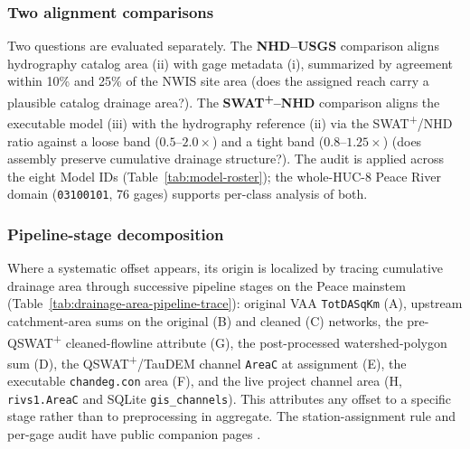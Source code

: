 \subsubsection*{Two alignment comparisons}
Two questions are evaluated separately. The \textbf{NHD--USGS} comparison aligns hydrography catalog area (ii) with gage metadata (i), summarized by agreement within 10\% and 25\% of the NWIS site area (does the assigned reach carry a plausible catalog drainage area?). The \textbf{SWAT\textsuperscript{+}--NHD} comparison aligns the executable model (iii) with the hydrography reference (ii) via the SWAT\textsuperscript{+}/NHD ratio against a loose band ($0.5$--$2.0\times$) and a tight band ($0.8$--$1.25\times$) (does assembly preserve cumulative drainage structure?). The audit is applied across the eight Model IDs (Table~\ref{tab:model-roster}); the whole-HUC-8 Peace River domain (\texttt{03100101}, 76 gages) supports per-class analysis of both.

\subsubsection*{Pipeline-stage decomposition}
Where a systematic offset appears, its origin is localized by tracing cumulative drainage area through successive pipeline stages on the Peace mainstem (Table~\ref{tab:drainage-area-pipeline-trace}): original VAA \texttt{TotDASqKm} (A), upstream catchment-area sums on the original (B) and cleaned (C) networks, the pre-QSWAT\textsuperscript{+} cleaned-flowline attribute (G), the post-processed watershed-polygon sum (D), the QSWAT\textsuperscript{+}/TauDEM channel \texttt{AreaC} at assignment (E), the executable \texttt{chandeg.con} area (F), and the live project channel area (H, \texttt{rivs1.AreaC} and SQLite \texttt{gis\_channels}). This attributes any offset to a specific stage rather than to preprocessing in aggregate. The station-assignment rule and per-gage audit have public companion pages \citep{SWATGenXcompanion}.
